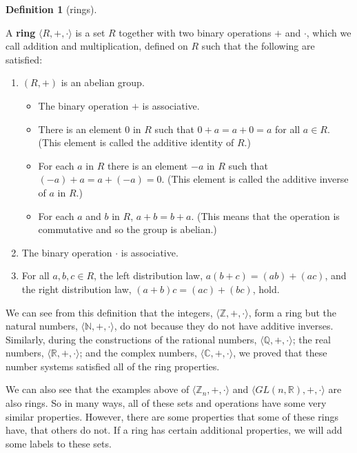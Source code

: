 \documentclass[
]{book}
\providecommand{\tightlist}{%
  \setlength{\itemsep}{0pt}\setlength{\parskip}{0pt}}
\theoremstyle{definition}
\newtheorem{definition}{Definition}[chapter]
\theoremstyle{definition}
\theoremstyle{definition}
\theoremstyle{definition}
\theoremstyle{remark}
\begin{document}
\begin{definition}[rings]
\protect\hypertarget{def:unlabeled-div-92}{}\label{def:unlabeled-div-92}

A \textbf{ring} \(\langle R,+,\cdot \rangle\) is a set \(R\) together with two binary operations \(+\) and \(\cdot\), which we call addition and multiplication, defined on \(R\) such that the following are satisfied:

\begin{enumerate}
\def\labelenumi{\arabic{enumi}.}
\tightlist
\item
  \(\left( R,+\right)\) is an abelian group.

  \begin{itemize}
  \tightlist
  \item
    The binary operation \(+\) is associative.
  \item
    There is an element \(0\) in \(R\) such that \(0+a=a+0=a\) for all \(a\in R\). (This element is called the additive identity of \(R\).)
  \item
    For each \(a\) in \(R\) there is an element \(-a\) in \(R\) such that \((-a)+a=a+(-a)=0\). (This element is called the additive inverse of \(a\) in \(R\).)
  \item
    For each \(a\) and \(b\) in \(R\), \(a+b=b+a\). (This means that the operation is commutative and so the group is abelian.)
  \end{itemize}
\item
  The binary operation \(\cdot\) is associative.
\item
  For all \(a,b,c\in R\), the left distribution law, \(a(b+c)=(ab)+(ac)\), and the right distribution law, \((a+b)c=(ac)+(bc)\), hold.
\end{enumerate}

\end{definition}

We can see from this definition that the integers, \(\langle\mathbb{Z},+,\cdot\rangle\), form a ring but the natural numbers, \(\langle\mathbb{N},+,\cdot\rangle\), do not because they do not have additive inverses. Similarly, during the constructions of the rational numbers, \(\langle\mathbb{Q},+,\cdot\rangle\); the real numbers, \(\langle\mathbb{R},+,\cdot\rangle\); and the complex numbers, \(\langle\mathbb{C},+,\cdot\rangle\), we proved that these number systems satisfied all of the ring properties.

We can also see that the examples above of \(\langle\mathbb{Z}_n,+,\cdot\rangle\) and \(\langle GL(n,\mathbb{R}),+,\cdot\rangle\) are also rings. So in many ways, all of these sets and operations have some very similar properties. However, there are some properties that some of these rings have, that others do not. If a ring has certain additional properties, we will add some labels to these sets.
\end{document}
